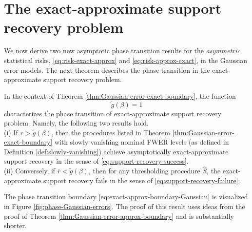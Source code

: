 \section{The exact-approximate support recovery problem}
\label{subsec:exact-approx-support-recovery-Gaussian}

We now derive two new asymptotic phase transition results for the \emph{asymmetric} statistical risks, \eqref{eq:risk-exact-approx} and \eqref{eq:risk-approx-exact}, in the Gaussian error models.
The next theorem describes the phase transition in the exact-approximate support recovery problem.

\begin{theorem} \label{thm:Gaussian-error-exact-approx-boundary}
In the context of Theorem \ref{thm:Gaussian-error-exact-boundary}, the function 
\begin{equation} \label{eq:exact-approx-boundary-Gaussian}
    \widetilde{g}(\beta) = 1
\end{equation}
characterizes the phase transition of exact-approximate support recovery problem.  Namely, the following two results hold.\\

{\rm (i)} If $\underline{r} > \widetilde{g}(\beta)$, then the procedures listed in Theorem \ref{thm:Gaussian-error-exact-boundary} with slowly vanishing nominal FWER levels (as defined in Definition \ref{def:slowly-vanishing}) achieve asymptotically exact-approximate support recovery in the sense of \eqref{eq:support-recovery-success}. \\

{\rm (ii)} Conversely, if $\overline{r} < \widetilde{g}(\beta)$, then for any thresholding procedure $\widehat{S}$, the exact-approximate support recovery fails in the sense of \eqref{eq:support-recovery-failure}.
\end{theorem}

The phase transition boundary \eqref{eq:exact-approx-boundary-Gaussian} is visualized in Figure \ref{fig:phase-Gaussian-errors}. The proof of this result
uses ideas from the proof of Theorem \ref{thm:Gaussian-error-approx-boundary} and is substantially shorter.

